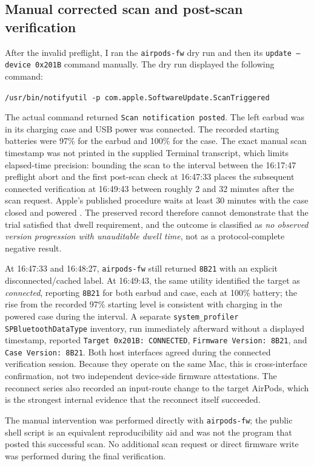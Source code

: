 \documentclass[11pt,letterpaper]{article}
\begin{document}
\subsection{Manual corrected scan and post-scan verification}
After the invalid preflight, I ran the \texttt{airpods-fw} dry run and then its \texttt{update --device 0x201B} command manually. The dry run displayed the following command:\par\noindent\texttt{/usr/bin/notifyutil -p com.apple.SoftwareUpdate.ScanTriggered}\par\noindent The actual command returned \texttt{Scan notification posted}. The left earbud was in its charging case and USB power was connected. The recorded starting batteries were 97\% for the earbud and 100\% for the case. The exact manual scan timestamp was not printed in the supplied Terminal transcript, which limits elapsed-time precision: bounding the scan to the interval between the 16:17:47 preflight abort and the first post-scan check at 16:47:33 places the subsequent connected verification at 16:49:43 between roughly 2 and 32 minutes after the scan request. Apple's published procedure waits at least 30 minutes with the case closed and powered \cite{applefw}. The preserved record therefore cannot demonstrate that the trial satisfied that dwell requirement, and the outcome is classified as \emph{no observed version progression with unauditable dwell time}, not as a protocol-complete negative result.

At 16:47:33 and 16:48:27, \texttt{airpods-fw} still returned \texttt{8B21} with an explicit disconnected/cached label. At 16:49:43, the same utility identified the target as \emph{connected}, reporting \texttt{8B21} for both earbud and case, each at 100\% battery; the rise from the recorded 97\% starting level is consistent with charging in the powered case during the interval. A separate \texttt{system\_profiler SPBluetoothDataType} inventory, run immediately afterward without a displayed timestamp, reported \texttt{Target 0x201B: CONNECTED}, \texttt{Firmware Version: 8B21}, and \texttt{Case Version: 8B21}. Both host interfaces agreed during the connected verification session. Because they operate on the same Mac, this is cross-interface confirmation, not two independent device-side firmware attestations. The reconnect series also recorded an input-route change to the target AirPods, which is the strongest internal evidence that the reconnect itself succeeded.

The manual intervention was performed directly with \texttt{airpods-fw}; the public shell script is an equivalent reproducibility aid and was not the program that posted this successful scan. No additional scan request or direct firmware write was performed during the final verification.
\end{document}
